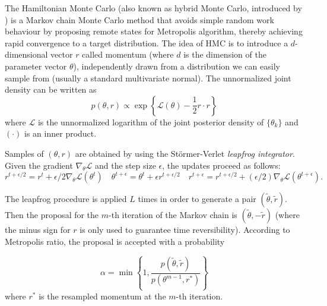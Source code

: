 \documentclass{article}
\begin{document}
The Hamiltonian Monte Carlo (also known as hybrid Monte Carlo, introduced by \citealp{duane1987hybrid}) is a Markov chain Monte Carlo method that avoids simple random work behaviour by proposing remote states for Metropolis algorithm, thereby achieving rapid convergence to a target distribution.
The idea of HMC is to introduce a $d$-dimensional vector $r$ called momentum (where $d$ is the dimension of the parameter vector $\theta$), independently drawn from a distribution we can easily sample from (usually a standard multivariate normal). The unnormalized joint density can be written as
$$ p(\theta,r) \propto \exp\left\{\mathcal{L}(\theta)-\frac{1}{2} r \cdot r\right\} $$
where $\mathcal{L}$ is the unnormalized logarithm of the joint posterior density of $\{\theta_k\}$ and $(\cdot)$ is an inner product.

\par Samples of $(\theta,r)$ are obtained by using the St{\"o}rmer-Verlet \textit{leapfrog integrator}. Given the gradient $\nabla_{\theta}\mathcal{L}$ and the step size $\epsilon$, the updates proceed as follows:
\begin{equation*}
r^{t+\epsilon/2}=r^t+\epsilon/2 \nabla_{\theta}\mathcal{L}(\theta^t)
\quad \theta^{t+\epsilon} = \theta^t+\epsilon r^{t+\epsilon/2} \quad
r^{t+\epsilon}=r^{t+\epsilon/2}+(\epsilon/2)\nabla_{\theta}\mathcal{L}(\theta^{t+\epsilon}).
\end{equation*}

\par The leapfrog procedure is applied $L$ times in order to generate a pair $(\tilde{\theta},\tilde{r})$. Then the proposal for the $m$-th iteration of the Markov chain is $(\tilde{\theta},-\tilde{r})$ (where the minus sign for $r$ is only used to guarantee time reversibility). According to Metropolis ratio, the proposal is accepted %
with a probability

\begin{equation*}
\alpha=\min\left\{1,\frac{p(\tilde{\theta},\tilde{r})}{p(\theta^{m-1},r^{*})}\right\}
\end{equation*}
\noindent where $r^{*}$ is the resampled momentum at the $m$-th iteration.
\end{document}
